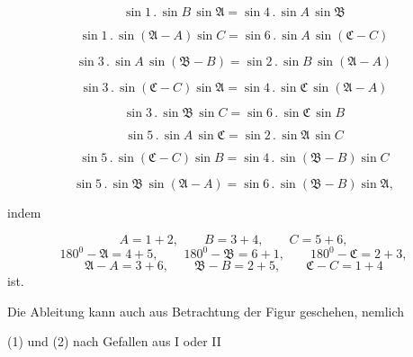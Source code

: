 \begin{equation}
\sin 1 \, . \, \sin B \, \sin\mathfrak{A} = \sin 4 \, . \, \sin A \, \sin\mathfrak{B}
\tag{4}
\end{equation}

\begin{equation}
\sin 1 \, . \, \sin(\mathfrak{A}-A)\sin C = \sin 6 \, . \, \sin A \, \sin(\mathfrak{C}-C)
\tag{5}
\end{equation}

\begin{equation}
\sin 3 \, . \, \sin A \, \sin(\mathfrak{B}-B) = \sin 2 \, . \, \sin B \, \sin(\mathfrak{A}-A)
\tag{6}
\end{equation}

\begin{equation}
\sin 3 \, . \, \sin(\mathfrak{C}-C)\sin\mathfrak{A} = \sin 4 \, . \, \sin\mathfrak{C} \, \sin(\mathfrak{A}-A)
\tag{7}
\end{equation}

\begin{equation}
\sin 3 \, . \, \sin\mathfrak{B} \, \sin C = \sin 6 \, . \, \sin\mathfrak{C} \, \sin B
\tag{8}
\end{equation}

\begin{equation}
\sin 5 \, . \, \sin A \, \sin\mathfrak{C} = \sin 2 \, . \, \sin\mathfrak{A} \, \sin C
\tag{9}
\end{equation}

\begin{equation}
\sin 5 \, . \, \sin(\mathfrak{C}-C)\sin B = \sin 4 \, . \, \sin(\mathfrak{B}-B)\sin C
\tag{10}
\end{equation}

\begin{equation}
\sin 5 \, . \, \sin\mathfrak{B} \, \sin(\mathfrak{A}-A) = \sin 6 \, . \, \sin(\mathfrak{B}-B)\sin\mathfrak{A},
\tag{11}
\end{equation}

indem

\[
A=1+2, \qquad B=3+4, \qquad C=5+6,
\]
\[
180^0-\mathfrak{A}=4+5, \qquad 180^0-\mathfrak{B}=6+1, \qquad 180^0-\mathfrak{C}=2+3,
\]
\[
\mathfrak{A}-A=3+6, \qquad \mathfrak{B}-B=2+5, \qquad \mathfrak{C}-C=1+4
\]
ist.

Die Ableitung kann auch aus Betrachtung der Figur geschehen, nemlich
\begin{center}(1) und (2) nach Gefallen aus I oder II\end{center}
